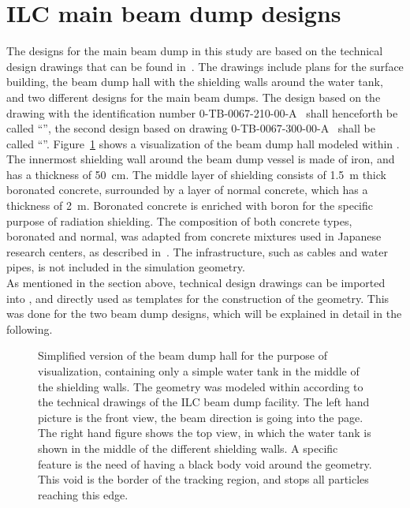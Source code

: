 \section{ILC main beam dump designs}
\label{BeamDumps:designs}
The designs for the main beam dump in this study are based on the technical design drawings that can be found in~\cite{Smith_drawings}.
The drawings include plans for the surface building, the beam dump hall with the shielding walls around the water tank, and two different designs for the main beam dumps.
The design based on the drawing with the identification number 0-TB-0067-210-00-A~\cite{Smith_drawings} shall henceforth be called ``\designone'', the second design based on drawing 0-TB-0067-300-00-A~\cite{Smith_drawings} shall be called ``\designtwo''.
Figure~\ref{fig:BeamDumps:geometry} shows a visualization of the beam dump hall modeled within \flair. 
The innermost shielding wall around the beam dump vessel is made of iron, and has a thickness of \SI{50}{\centi\meter}.
The middle layer of shielding consists of \SI{1.5}{\meter} thick boronated concrete, surrounded by a layer of normal concrete, which has a thickness of \SI{2}{\meter}.
Boronated concrete is enriched with boron for the specific purpose of radiation shielding.
The composition of both concrete types, boronated and normal, was adapted from concrete mixtures used in Japanese research centers, as described in~\cite{concrete}. 
The infrastructure, such as cables and water pipes, is not included in the simulation geometry.
\\As mentioned in the section above, technical design drawings can be imported into \flair, and directly used as templates for the construction of the geometry.
This was done for the two beam dump designs, which will be explained in detail in the following.

\begin{figure}[hbp]
\begin{center}
\caption[Geometry visualization of the ILC main beam dump hall]{Simplified version of the beam dump hall for the purpose of visualization, containing only a simple water tank in the middle of the shielding walls. 
The geometry was modeled within \flair according to the technical drawings of the ILC beam dump facility.
The left hand picture is the front view, the beam direction is going into the page.
The right hand figure shows the top view, in which the water tank is shown in the middle of the different shielding walls. 
A \fluka specific feature is the need of having a black body void around the geometry. 
This void is the border of the tracking region, and stops all particles reaching this edge.}
\label{fig:BeamDumps:geometry}
\end{center}
\end{figure}

